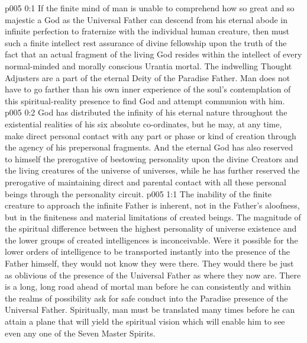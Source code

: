 \author{Divine Counsellor}
\vs p005 0:1 If the finite mind of man is unable to comprehend how so great and so majestic a God as the Universal Father can descend from his eternal abode in infinite perfection to fraternize with the individual human creature, then must such a finite intellect rest assurance of divine fellowship upon the truth of the fact that an actual fragment of the living God resides within the intellect of every normal\hyp{}minded and morally conscious Urantia mortal. The indwelling Thought Adjusters are a part of the eternal Deity of the Paradise Father. Man does not have to go farther than his own inner experience of the soul’s contemplation of this spiritual\hyp{}reality presence to find God and attempt communion with him.
\vs p005 0:2 God has distributed the infinity of his eternal nature throughout the existential realities of his six absolute co\hyp{}ordinates, but he may, at any time, make direct personal contact with any part or phase or kind of creation through the agency of his prepersonal fragments. And the eternal God has also reserved to himself the prerogative of bestowing personality upon the divine Creators and the living creatures of the universe of universes, while he has further reserved the prerogative of maintaining direct and parental contact with all these personal beings through the personality circuit.
\vs p005 1:1 The inability of the finite creature to approach the infinite Father is inherent, not in the Father’s aloofness, but in the finiteness and material limitations of created beings. The magnitude of the spiritual difference between the highest personality of universe existence and the lower groups of created intelligences is inconceivable. Were it possible for the lower orders of intelligence to be transported instantly into the presence of the Father himself, they would not know they were there. They would there be just as oblivious of the presence of the Universal Father as where they now are. There is a long, long road ahead of mortal man before he can consistently and within the realms of possibility ask for safe conduct into the Paradise presence of the Universal Father. Spiritually, man must be translated many times before he can attain a plane that will yield the spiritual vision which will enable him to see even any one of the Seven Master Spirits.
